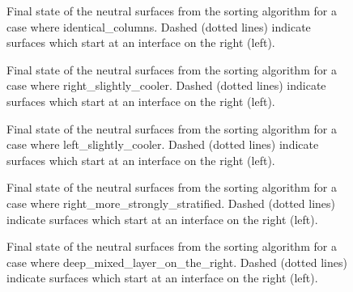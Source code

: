 \begin{figure}[ht]\begin{center}
  \caption{Final state of the neutral surfaces from the sorting algorithm for a case where identical_columns. Dashed (dotted lines) indicate surfaces which start at an interface on the right (left).}
  \label{figure:identical_columns} \end{center}
\end{figure}
\begin{figure}[ht]\begin{center}
  \caption{Final state of the neutral surfaces from the sorting algorithm for a case where right_slightly_cooler. Dashed (dotted lines) indicate surfaces which start at an interface on the right (left).}
  \label{figure:right_slightly_cooler} \end{center}
\end{figure}
\begin{figure}[ht]\begin{center}
  \caption{Final state of the neutral surfaces from the sorting algorithm for a case where left_slightly_cooler. Dashed (dotted lines) indicate surfaces which start at an interface on the right (left).}
  \label{figure:left_slightly_cooler} \end{center}
\end{figure}
\begin{figure}[ht]\begin{center}
  \caption{Final state of the neutral surfaces from the sorting algorithm for a case where right_more_strongly_stratified. Dashed (dotted lines) indicate surfaces which start at an interface on the right (left).}
  \label{figure:right_more_strongly_stratified} \end{center}
\end{figure}
\begin{figure}[ht]\begin{center}
  \caption{Final state of the neutral surfaces from the sorting algorithm for a case where deep_mixed_layer_on_the_right. Dashed (dotted lines) indicate surfaces which start at an interface on the right (left).}
  \label{figure:deep_mixed_layer_on_the_right} \end{center}
\end{figure}
